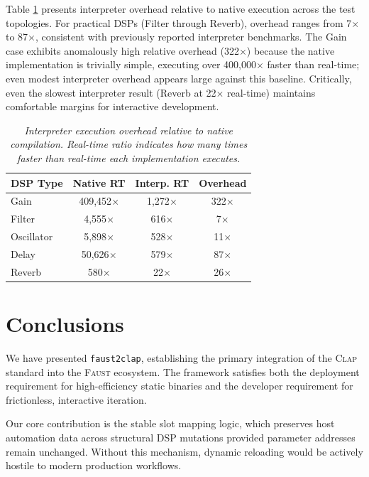 \documentclass[twoside,a4paper]{article}
\newcommand{\F}{\textsc{Faust}}
\newcommand{\CLAP}{\textsc{Clap}}
\begin{document}
Table \ref{tab:overhead} presents interpreter overhead relative to native execution across the test topologies. For practical DSPs (Filter through Reverb), overhead ranges from 7$\times$ to 87$\times$, consistent with previously reported interpreter benchmarks. The Gain case exhibits anomalously high relative overhead (322$\times$) because the native implementation is trivially simple, executing over 400,000$\times$ faster than real-time; even modest interpreter overhead appears large against this baseline. Critically, even the slowest interpreter result (Reverb at 22$\times$ real-time) maintains comfortable margins for interactive development.

\begin{table}[ht]
  \caption{\itshape Interpreter execution overhead relative to native compilation. Real-time ratio indicates how many times faster than real-time each implementation executes.}
    \centering
    \begin{tabular}{|l|c|c|c|}
        \hline
        \textbf{DSP Type} & \textbf{Native RT} & \textbf{Interp. RT} & \textbf{Overhead} \\\hline
        Gain & 409,452$\times$ & 1,272$\times$ & 322$\times$ \\
        Filter & 4,555$\times$ & 616$\times$ & 7$\times$ \\
        Oscillator & 5,898$\times$ & 528$\times$ & 11$\times$ \\
        Delay & 50,626$\times$ & 579$\times$ & 87$\times$ \\
        Reverb & 580$\times$ & 22$\times$ & 26$\times$ \\\hline
    \end{tabular}
    \label{tab:overhead}
\end{table} 

\section{Conclusions}
\label{sec:conclusions}

We have presented \texttt{faust2clap}, establishing the primary integration of the \CLAP{} standard into the \F{} ecosystem. The framework satisfies both the deployment requirement for high-efficiency static binaries and the developer requirement for frictionless, interactive iteration. 

Our core contribution is the stable slot mapping logic, which preserves host automation data across structural DSP mutations provided parameter addresses remain unchanged. Without this mechanism, dynamic reloading would be actively hostile to modern production workflows.
\end{document}
